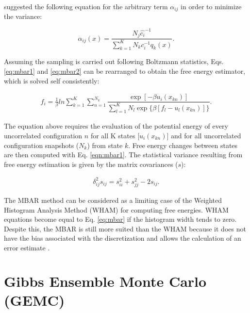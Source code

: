  suggested the following equation for the arbitrary term $\alpha _{ij}$ in order to minimize the variance:

\begin{equation}
\label{eq:mbar2}
\alpha _{ij} (x) = \frac{N_{j} \hat{c_{i}} ^{-1}}{\sum_{k=1}^{K} N_{k} c_{i} ^{-1} q_{k}(x)} .
\end{equation}

Assuming the sampling is carried out following Boltzmann statistics, Eqs. \eqref{eq:mbar1} and \eqref{eq:mbar2} can be rearranged to obtain the free energy estimator, which is solved self consistently:  

\begin{equation}
\label{eq:mbar}
\begin{aligned}
f_{i} = \frac{1}{\beta}ln \sum_{k=1}^{K} \sum_{n=1}^{N_{k}}
\dfrac{\exp[-\beta u_{i}(x_{kn})]}{\sum_{l=1}^{K} N_{l} \exp \lbrace \beta [f_{l} - u_{l}(x_{kn})] \rbrace} .
\end{aligned}
\end{equation}

The equation above requires the evaluation of the potential energy  of every  uncorrelated configuration $n$ for all K states [$u_{i}(x_{kn})$] and for all uncorrelated configuration snapshots ($N_{k}$) from state $k$. Free energy changes between states are then computed with Eq. \ref{eqn:mbar1}. The statistical variance resulting from free energy estimation is given by the matrix covariances ($s$):

\begin{equation}
\begin{aligned}
\delta _{ij}^{2} s_{ij} = s_{ii}^{2} + s_{jj}^{2} - 2 s_{ij}.
\end{aligned}
\end{equation}

The MBAR method can be considered as a limiting case of the 
Weighted Histogram Analysis Method (WHAM) \cite{wham} for computing free energies. WHAM equations become equal to Eq. \eqref{eq:mbar} if the histogram width tends to zero. Despite this, the MBAR is still more suited than the WHAM because it does not have the bias associated with the discretization and allows the calculation of an error estimate \cite{mbar}.
	
\section{Gibbs Ensemble Monte Carlo (GEMC)}\label{gemc}
	
